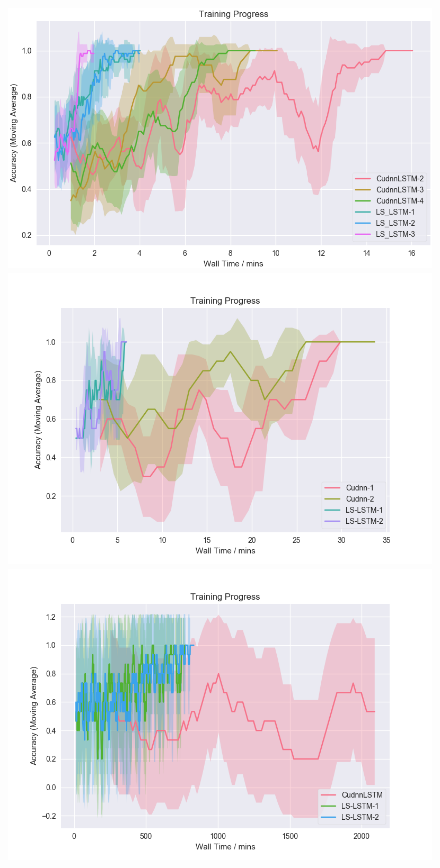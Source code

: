 \documentclass{article}
\begin{document}
\begin{figure}
  \centering
  \begin{minipage}{0.5\textwidth}
    \includegraphics[width=1.0\textwidth]{./1k_synthetic.png}
  \end{minipage}%
    \begin{minipage}{0.5\textwidth}
    \includegraphics[width=1.0\textwidth]{./8k_synthetic.png}      
  \end{minipage}
  \begin{minipage}{0.6\textwidth}
    \includegraphics[width=1.0\textwidth]{./1M_synthetic.png}      

\end{minipage}
\end{figure}
\end{document}
